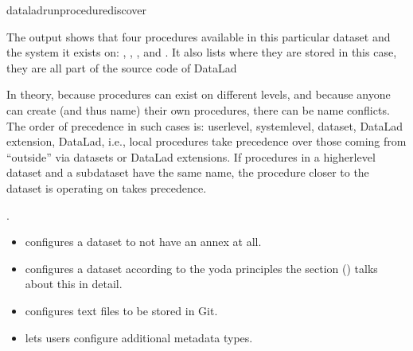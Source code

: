 \begin{sphinxVerbatim}[commandchars=\\\{\}]
dataladrun\PYGZhy{}procedure\PYGZhy{}\PYGZhy{}discover
\end{sphinxVerbatim}

\sphinxAtStartPar
The output shows that four procedures available in this particular dataset and the system it exists on:
, , , and .
It also lists where they are stored \textendash{} in this case,
they are all part of the source code of DataLad%
\begin{footnote}\sphinxAtStartFootnote
In theory, because procedures can exist on different levels, and
because anyone can create (and thus name) their own procedures, there
can be name conflicts. The order of precedence in such cases is:
user\sphinxhyphen{}level, system\sphinxhyphen{}level, dataset, DataLad extension, DataLad, i.e.,
local procedures take precedence over those coming from “outside” via
datasets or DataLad extensions.
If procedures in a higher\sphinxhyphen{}level dataset and a subdataset have the same
name, the procedure closer to the dataset  is
operating on takes precedence.
%
\end{footnote}.
\begin{itemize}
\item {} 
\sphinxAtStartPar
{} configures a dataset to not have an annex at all.

\item {} 
\sphinxAtStartPar
{} configures a dataset according to the yoda
principles \textendash{} the section {\hyperref[\detokenize{basics/101-127-yoda:yoda}]{}} () talks about this in detail.

\item {} 
\sphinxAtStartPar
{} configures text files to be stored in Git.

\item {} 
\sphinxAtStartPar
{} lets users configure additional metadata
types.

\end{itemize}

